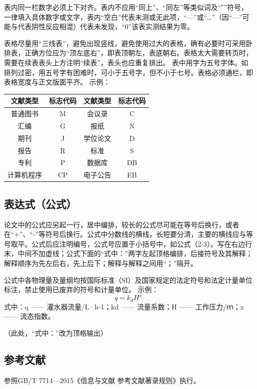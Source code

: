 表内同一栏数字必须上下对齐。表内不应用“同上”、“同左”等类似词及“″”符号，一律填入具体数字或文字，表内“空白”代表未测或无此项，“—”或“…”（因“—”可能与代表阴性反应相混）代表未发现，“0”该表实测结果为零。

表格尽量用“三线表”，避免出现竖线，避免使用过大的表格，确有必要时可采用卧排表，正确方位应为“顶左底右”，即表顶朝左，表底朝右。表格太大需要转页时，需要在续表表头上方注明“续表”，表头也应重复排出。
表中用字为五号字体。如排列过密，用五号字有困难时，可小于五号字，但不小于七号。表格必须通栏，即表格宽度与正文版面平齐。
示例：
\begin{table}[htp]
    \centering
    \begin{tabular}{|c|c|c|c|}
    \hline
    文献类型  & 标志代码 & 文献类型 & 标志代码 \\ \hline
    普通图书  & M    & 会议录  & C    \\ \hline
    汇编    & G    & 报纸   & N    \\ \hline
    期刊    & J    & 学位论文 & D    \\ \hline
    报告    & R    & 标准   & S    \\ \hline
    专利    & P    & 数据库  & DB   \\ \hline
    计算机程序 & CP   & 电子公告 & EB   \\ \hline
    \end{tabular}
    \label{tab:demo}    
\end{table}
\subsection{表达式（公式）}
论文中的公式应另起一行，居中编排，较长的公式尽可能在等号后换行，或者在“+”、“-”等符号后换行。公式中分数线的横线，长短要分清，主要的横线应与等号取平。公式后应注明编号，公式号应置于小括号中，如公式（2-3）。写在右边行末，中间不加虚线；公式下面的“式中：”两字左起顶格编排，后接符号及其解释；解释顺序为先左后右，先上后下；解释与解释之间用“；”隔开。

公式中各物理量及量纲均按国际标准（SI）及国家规定的法定符号和法定计量单位标注，禁止使用已废弃的符号和计量单位。
示例：
\begin{equation}
\label{eq:demo}
q=k_dH^x
\end{equation}
式中：q —— 灌水器流量/L·h-1；kd —— 流量系数；H —— 工作压力/ｍ；x —— 流态指数。

（此处，“式中：”改为顶格输出）

\subsection{参考文献}
参照GB/T 7714—2015《信息与文献 参考文献著录规则》执行。
